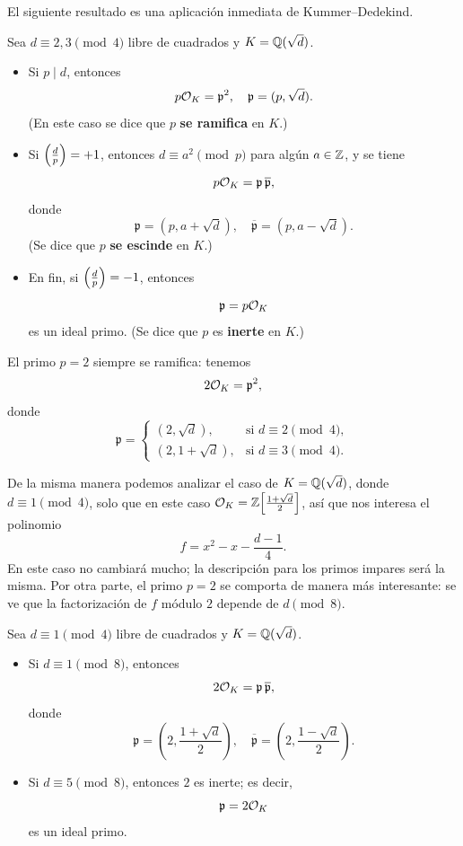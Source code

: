 El siguiente resultado es una aplicación inmediata de Kummer--Dedekind.

\begin{proposicion}
  Sea $d \equiv 2,3 \pmod{4}$ libre de cuadrados y $K = \mathbb{Q} (\sqrt{d})$.

  \begin{itemize}
  \item Si $p \mid d$, entonces
    $$p \mathcal{O}_K = \mathfrak{p}^2, \quad \mathfrak{p} = (p, \sqrt{d}).$$
    (En este caso se dice que $p$ \textbf{se ramifica} en $K$.)

  \item Si $\left(\frac{d}{p}\right) = +1$, entonces $d \equiv a^2 \pmod{p}$ para
    algún $a \in \mathbb{Z}$, y se tiene
    $$p \mathcal{O}_K = \mathfrak{p} \, \overline{\mathfrak{p}},$$
    donde
    \[ \mathfrak{p} = (p, a + \sqrt{d}), \quad
       \overline{\mathfrak{p}} = (p, a - \sqrt{d}). \]
    (Se dice que $p$ \textbf{se escinde} en $K$.)

  \item En fin, si $\left(\frac{d}{p}\right) = -1$, entonces
    $$\mathfrak{p} = p \mathcal{O}_K$$
    es un ideal primo. (Se dice que $p$ es \textbf{inerte} en $K$.)
  \end{itemize}

  El primo $p = 2$ siempre se ramifica: tenemos
  $$2 \mathcal{O}_K = \mathfrak{p}^2,$$
  donde
  \[ \mathfrak{p} = \begin{cases}
    (2, \sqrt{d}), & \text{si }d \equiv 2\pmod{4},\\
    (2, 1+\sqrt{d}), & \text{si }d \equiv 3\pmod{4}.
  \end{cases} \]
\end{proposicion}

De la misma manera podemos analizar el caso de $K = \mathbb{Q} (\sqrt{d})$,
donde $d \equiv 1 \pmod{4}$, solo que en este caso
$\mathcal{O}_K = \mathbb{Z} \Bigl[\frac{1+\sqrt{d}}{2}\Bigr]$, así que nos interesa
el polinomio
$$f = x^2 - x - \frac{d-1}{4}.$$
En este caso no cambiará mucho; la descripción para los primos impares será
la misma. Por otra parte, el primo $p = 2$ se comporta de manera más
interesante: se ve que la factorización de $f$ módulo $2$ depende de
$d \pmod {8}$.

\begin{proposicion}
  Sea $d \equiv 1 \pmod{4}$ libre de cuadrados y $K = \mathbb{Q} (\sqrt{d})$.

  \begin{itemize}
  \item Si $d \equiv 1 \pmod{8}$, entonces
    $$2 \mathcal{O}_K = \mathfrak{p}\,\overline{\mathfrak{p}},$$
    donde
    \[ \mathfrak{p} = \left(2, \frac{1 + \sqrt{d}}{2}\right), \quad
       \overline{\mathfrak{p}} = \left(2, \frac{1 - \sqrt{d}}{2}\right). \]

  \item Si $d \equiv 5 \pmod{8}$, entonces $2$ es inerte; es decir,
    $$\mathfrak{p} = 2\mathcal{O}_K$$
    es un ideal primo.
  \end{itemize}
\end{proposicion}

